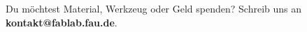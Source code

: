 Du möchtest Material, Werkzeug oder Geld spenden? Schreib uns an
\textbf{\mbox{kontakt@fablab.fau.de}}.
